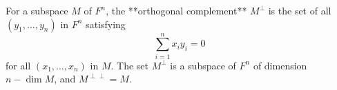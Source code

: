 For a subspace $M$ of $F^n$, the **orthogonal complement** $M^\perp$ is the set of all $(y_1, \ldots, y_n)$ in $F^n$ satisfying
$$\sum_{i=1}^{n} x_i y_i = 0$$
for all $(x_1, \ldots, x_n)$ in $M$. The set $M^\perp$ is a subspace of $F^n$ of dimension $n - \dim M$, and $M^{\perp\perp} = M$.

